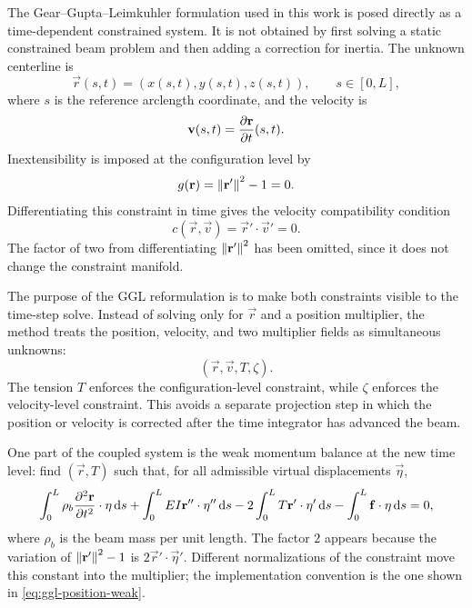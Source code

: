 The Gear--Gupta--Leimkuhler formulation used in this work is posed directly as
a time-dependent constrained system. It is not obtained by first solving a
static constrained beam problem and then adding a correction for inertia. The
unknown centerline is
\begin{equation*}
    \vec r(s,t) = (x(s,t),y(s,t),z(s,t)),
    \qquad s\in[0,L],
\end{equation*}
where \(s\) is the reference arclength coordinate, and the velocity is
\begin{equation*}
    \mathbf{v}(s,t) = \pdv{\mathbf{r}}{t}(s,t).
\end{equation*}
Inextensibility is imposed at the configuration level by
\begin{equation}\label{eq:ggl-inextensibility}
    g(\mathbf{r}) = \left\lVert \mathbf{r}' \right\rVert^2 - 1 = 0.
\end{equation}
Differentiating this constraint in time gives the velocity compatibility
condition
\begin{equation}\label{eq:ggl-velocity-constraint}
    c(\vec r,\vec v) = \vec r'\cdot \vec v' = 0.
\end{equation}
The factor of two from differentiating \(\left\lVert \mathbf{r}' \right\rVert^2\) has been omitted,
since it does not change the constraint manifold.

The purpose of the GGL reformulation is to make both constraints visible to the
time-step solve. Instead of solving only for \(\vec r\) and a position
multiplier, the method treats the position, velocity, and two multiplier fields
as simultaneous unknowns:
\begin{equation*}
    (\vec r,\vec v,T,\zeta).
\end{equation*}
The tension \(T\) enforces the configuration-level constraint, while
\(\zeta\) enforces the velocity-level constraint. This avoids a separate
projection step in which the position or velocity is corrected after the time
integrator has advanced the beam.

One part of the coupled system is the weak momentum balance at the new time
level: find \((\vec r,T)\) such that, for all admissible virtual
displacements \(\vec \eta\),
\begin{equation}\label{eq:ggl-position-weak}
    \int_0^L \rho_b \pdv[2]{\vec r}{t} \cdot \vec \eta \odif{s}
    +
    \int_0^L EI \vec r'' \cdot \vec \eta'' \odif{s}
    -
    2\int_0^L T \vec r' \cdot \vec \eta' \odif{s}
    -
    \int_0^L \vec f \cdot \vec \eta \odif{s}
    = 0,
\end{equation}
where \(\rho_b\) is the beam mass per unit length. The factor \(2\) appears
because the variation of \(\left\lVert \mathbf{r}' \right\rVert^2-1\) is
\(2\vec r'\cdot\vec \eta'\). Different normalizations of the constraint move
this constant into the multiplier; the implementation convention is the one
shown in \eqref{eq:ggl-position-weak}.

